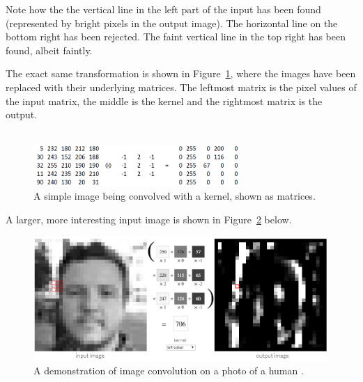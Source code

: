 Note how the the vertical line in the left part of the input has been found (represented by bright pixels in the output image). The horizontal line on the bottom right has been rejected. The faint vertical line in the top right has been found, albeit faintly.

The exact same transformation is shown in Figure~\ref{fig:simple_conv_as_numbers}, where the images have been replaced with their underlying matrices. The leftmost matrix is the pixel values of the input matrix, the middle is the kernel and the rightmost matrix is the output. \\ \\


\begin{figure}[h!]
  \centering
  \includegraphics[width=0.7\textwidth]{literature_review/simple_conv_as_numbers}
  \caption{\label{fig:simple_conv_as_numbers}A simple image being convolved with a kernel, shown as matrices.}
\end{figure}


A larger, more interesting input image is shown in Figure~\ref{fig:image_kernel_demo} below.


\begin{figure}[h!]
  \centering
  \includegraphics[width=\textwidth]{literature_review/image_kernel_demo}
  \caption{\label{fig:image_kernel_demo}A demonstration of image convolution on a photo of a human \cite{website:setosa_kernel}.}
\end{figure}

